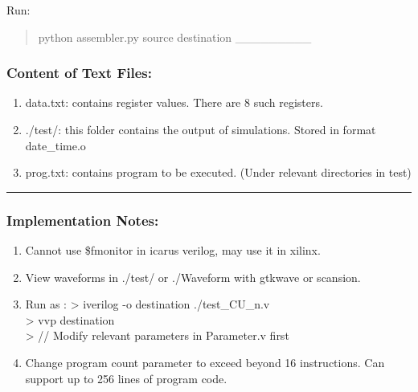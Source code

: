 \documentclass[11pt]{article}
\providecommand{\tightlist}{%
      \setlength{\itemsep}{0pt}\setlength{\parskip}{0pt}}
\begin{document}
Run:

\begin{quote}
python assembler.py source destination \_\_\_\_\_\_\_\_\_
\end{quote}

\subsubsection{Content of Text Files:}\label{content-of-text-files}

\begin{enumerate}
\def\labelenumi{\arabic{enumi}.}
\tightlist
\item
  data.txt: contains register values. There are 8 such registers.
\item
  ./test/: this folder contains the output of simulations. Stored in
  format date\_time.o
\item
  prog.txt: contains program to be executed. (Under relevant directories
  in test)
\end{enumerate}

\begin{center}\rule{0.5\linewidth}{\linethickness}\end{center}

\subsubsection{Implementation Notes:}\label{implementation-notes}

\begin{enumerate}
\def\labelenumi{\arabic{enumi}.}
\tightlist
\item
  Cannot use \$fmonitor in icarus verilog, may use it in xilinx.
\item
  View waveforms in ./test/ or ./Waveform with gtkwave or scansion.
\item
  Run as : \textgreater{} iverilog -o destination ./test\_CU\_n.v\\
  \textgreater{} vvp destination\\
  \textgreater{} // Modify relevant parameters in Parameter.v first\\
\item
  Change program count parameter to exceed beyond 16 instructions. Can
  support up to 256 lines of program code.
\end{enumerate}


    
    
    
    
\end{document}
